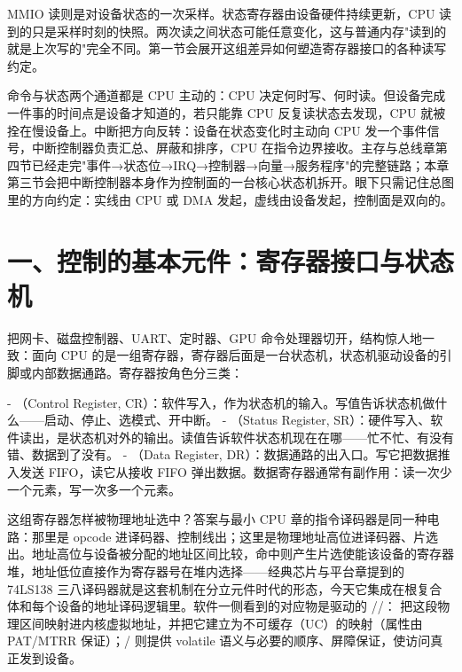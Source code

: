 MMIO 读则是对设备状态的一次采样。状态寄存器由设备硬件持续更新，CPU 读到的只是采样时刻的快照。两次读之间状态可能任意变化，这与普通内存"读到的就是上次写的"完全不同。第一节会展开这组差异如何塑造寄存器接口的各种读写约定。


命令与状态两个通道都是 CPU 主动的：CPU 决定何时写、何时读。但设备完成一件事的时间点是设备才知道的，若只能靠 CPU 反复读状态去发现，CPU 就被拴在慢设备上。中断把方向反转：设备在状态变化时主动向 CPU 发一个事件信号，中断控制器负责汇总、屏蔽和排序，CPU 在指令边界接收。主存与总线章第四节已经走完"事件→状态位→IRQ→控制器→向量→服务程序"的完整链路；本章第三节会把中断控制器本身作为控制面的一台核心状态机拆开。眼下只需记住总图里的方向约定：实线由 CPU 或 DMA 发起，虚线由设备发起，控制面是双向的。

\section{一、控制的基本元件：寄存器接口与状态机}


把网卡、磁盘控制器、UART、定时器、GPU 命令处理器切开，结构惊人地一致：面向 CPU 的是一组寄存器，寄存器后面是一台状态机，状态机驱动设备的引脚或内部数据通路。寄存器按角色分三类：

- （Control Register, CR）：软件写入，作为状态机的输入。写值告诉状态机做什么——启动、停止、选模式、开中断。
- （Status Register, SR）：硬件写入、软件读出，是状态机对外的输出。读值告诉软件状态机现在在哪——忙不忙、有没有错、数据到了没有。
- （Data Register, DR）：数据通路的出入口。写它把数据推入发送 FIFO，读它从接收 FIFO 弹出数据。数据寄存器通常有副作用：读一次少一个元素，写一次多一个元素。

这组寄存器怎样被物理地址选中？答案与最小 CPU 章的指令译码器是同一种电路：那里是 opcode 进译码器、控制线出；这里是物理地址高位进译码器、片选出。地址高位与设备被分配的地址区间比较，命中则产生片选使能该设备的寄存器堆，地址低位直接作为寄存器号在堆内选择——经典芯片与平台章提到的 74LS138 三八译码器就是这套机制在分立元件时代的形态，今天它集成在根复合体和每个设备的地址译码逻辑里。软件一侧看到的对应物是驱动的 //： 把这段物理区间映射进内核虚拟地址，并把它建立为不可缓存（UC）的映射（属性由 PAT/MTRR 保证）；/ 则提供 volatile 语义与必要的顺序、屏障保证，使访问真正发到设备。

